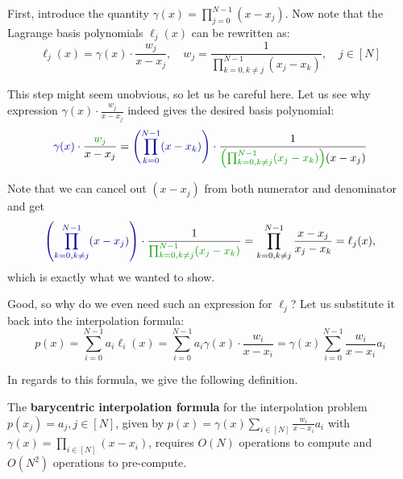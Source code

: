 \documentclass[../lecture-notes.tex]{subfiles}
\begin{document}
First, introduce the quantity $\gamma(x) = \prod_{j=0}^{N-1}(x-x_j)$. Now note that 
the Lagrange basis polynomials $\ell_j(x)$ can be rewritten as:
\begin{equation*}
    \ell_j(x) = \gamma(x) \cdot \frac{w_j}{x-x_j}, \quad w_j = \frac{1}{\prod_{k=0,k \neq j}^{N-1}(x_j-x_k)}, \quad j \in [N]
\end{equation*}

\begin{remark}
    This step might seem unobvious, so let us be careful here. Let us see why expression $\gamma(x) \cdot \frac{w_j}{x-x_j}$ 
    indeed gives the desired basis polynomial:
    \begin{equation*}
        \textcolor{blue!60!black}{\gamma(x)} \cdot \frac{\textcolor{green!60!black}{w_j}}{x-x_j} = \textcolor{blue!60!black}{\left(\prod_{k=0}^{N-1}(x-x_k) \right)} \cdot \frac{1}{\textcolor{green!60!black}{\left(\prod_{k=0,k \neq j}^{N-1}(x_j-x_k)\right)}(x-x_j)}
    \end{equation*}

    Note that we can cancel out $(x-x_j)$ from both numerator and denominator and get
    \begin{equation*}
        \textcolor{blue!60!black}{\left(\prod_{k=0,k\neq j}^{N-1}(x-x_j) \right)} \cdot \frac{1}{\textcolor{green!60!black}{\prod_{k=0,k \neq j}^{N-1}(x_j-x_k)}} = \prod_{k=0,k \neq j}^{N-1} \frac{x-x_j}{x_j-x_k} = \ell_j(x),
    \end{equation*}
    which is exactly what we wanted to show.
\end{remark}

Good, so why do we even need such an expression for $\ell_j$? Let us substitute it back into the interpolation formula:
\begin{equation*}
    p(x) = \sum_{i=0}^{N-1} a_i \ell_i(x) = \sum_{i=0}^{N-1}a_i \gamma(x) \cdot \frac{w_i}{x-x_i} = \gamma(x) \sum_{i=0}^{N-1} \frac{w_i}{x-x_i}a_i
\end{equation*}

In regards to this formula, we give the following definition.
\begin{proposition}\label{prop:barycentric}
    The \textbf{barycentric interpolation formula} for the interpolation problem
    $p(x_j)=a_j, j \in [N]$, given by $p(x) = \gamma(x) \sum_{i \in [N]}
    \frac{w_i}{x-x_i}a_i$ with $\gamma(x)=\prod_{i \in [N]}(x-x_i)$, requires $O(N)$ operations to compute and $O(N^2)$
    operations to pre-compute.
\end{proposition}
\end{document}
